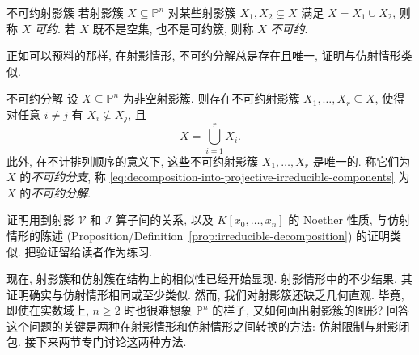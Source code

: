 \begin{Definition}{不可约射影簇}\leavevmode\label{def:irreducible-projective-variety}
若射影簇 $X\subseteq\mathbb{P}^{n}$ 对某些射影簇 $X_{1},X_{2}\subsetneq X$ 满足 $X=X_{1}\cup X_{2}$, 则称 $X$ \emph{可约}. 若 $X$ 既不是空集, 也不是可约簇, 则称 $X$ \emph{不可约}.
\end{Definition}

正如可以预料的那样, 在射影情形, 不可约分解总是存在且唯一, 证明与仿射情形类似.

\begin{BookPropositionDefinition}{不可约分解}\leavevmode\label{prop:projective-irreducible-decomposition}
设 $X\subseteq\mathbb{P}^{n}$ 为非空射影簇. 则存在不可约射影簇 $X_{1},\ldots,X_{r}\subseteq X$, 使得对任意 $i\neq j$ 有 $X_{i}\not\subseteq X_{j}$, 且
\begin{equation}\label{eq:decomposition-into-projective-irreducible-components}
  X=\bigcup_{i=1}^{r}X_{i}.
\end{equation}
此外, 在不计排列顺序的意义下, 这些不可约射影簇 $X_{1},\ldots,X_{r}$ 是唯一的. 称它们为 $X$ 的\emph{不可约分支}, 称 \eqref{eq:decomposition-into-projective-irreducible-components} 为 $X$ 的\emph{不可约分解}.
\end{BookPropositionDefinition}
\begin{Proof}
证明用到射影 $\mathcal{V}$ 和 $\mathcal{I}$ 算子间的关系, 以及 $K[x_{0},\ldots,x_{n}]$ 的 Noether 性质, 与仿射情形的陈述 (Proposition/Definition~\ref{prop:irreducible-decomposition}) 的证明类似. 把验证留给读者作为练习.
\end{Proof}

现在, 射影簇和仿射簇在结构上的相似性已经开始显现. 射影情形中的不少结果, 其证明确实与仿射情形相同或至少类似. 然而, 我们对射影簇还缺乏几何直观. 毕竟, 即使在实数域上, $n\geq2$ 时也很难想象 $\mathbb{P}^{n}$ 的样子, 又如何画出射影簇的图形? 回答这个问题的关键是两种在射影情形和仿射情形之间转换的方法: 仿射限制与射影闭包. 接下来两节专门讨论这两种方法.

